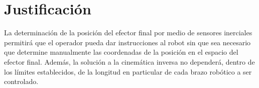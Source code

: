 \section{Justificación}

La determinación de la posición del efector final por medio de sensores inerciales permitirá que el operador pueda dar instrucciones al robot sin que sea necesario que determine manualmente las coordenadas de la posición en el espacio del efector final. Además, la solución a la cinemática inversa no dependerá, dentro de los límites establecidos, de la longitud en particular de cada brazo robótico a ser controlado.